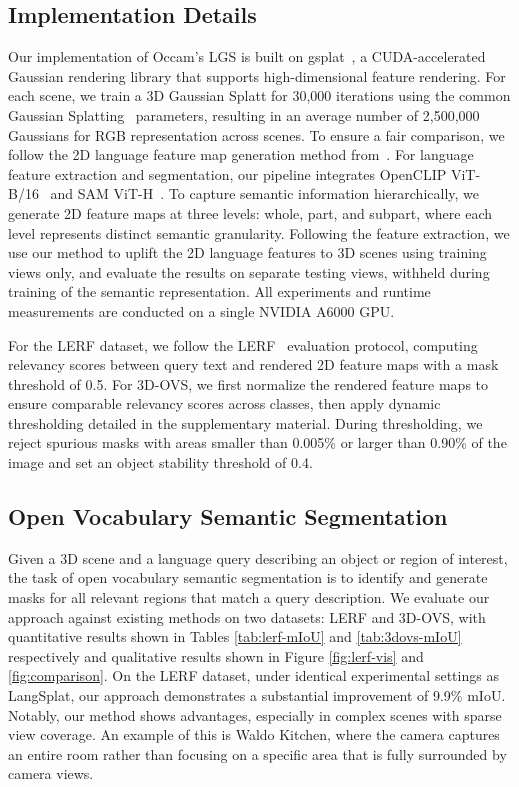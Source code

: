 \subsection{Implementation Details}
Our implementation of Occam's LGS is built on gsplat~\cite{ye2024gsplatopensourcelibrarygaussian}, a CUDA-accelerated Gaussian rendering library that supports high-dimensional feature rendering. For each scene, we train a 3D Gaussian Splatt for 30,000 iterations using the common Gaussian Splatting~\cite{kerbl3Dgaussians} parameters, resulting in an average number of 2,500,000 Gaussians for RGB representation across scenes. To ensure a fair comparison, we follow the 2D language feature map generation method from~\cite{qin2024langsplat}. For language feature extraction and segmentation, our pipeline integrates OpenCLIP ViT-B/16~\cite{Radford2021LearningTV} and SAM ViT-H~\cite{kirillov2023segment}. To capture semantic information hierarchically, we generate 2D feature maps at three levels:  whole, part, and subpart, where each level represents distinct semantic granularity. Following the feature extraction, we use our method to uplift the 2D language features to 3D scenes using training views only, and evaluate the results on separate testing views, withheld during training of the semantic representation. All experiments and runtime measurements are conducted on a single NVIDIA A6000 GPU. 

For the LERF dataset, we follow the LERF~\cite{kerr2023lerf} evaluation protocol, computing relevancy scores between query text and rendered 2D feature maps with a mask threshold of 0.5. For 3D-OVS, we first normalize the rendered feature maps to ensure comparable relevancy scores across classes, then apply dynamic thresholding detailed in the supplementary material. During thresholding, we reject spurious masks with areas smaller than 0.005\% or larger than 0.90\% of the image and set an object stability threshold of 0.4.

\subsection{Open Vocabulary Semantic Segmentation}
Given a 3D scene and a language query describing an object or region of interest, the task of open vocabulary semantic segmentation is to identify and generate masks for all relevant regions that match a query description. We evaluate our approach against existing methods on two datasets: LERF and 3D-OVS, with quantitative results shown in Tables \ref{tab:lerf-mIoU} and \ref{tab:3dovs-mIoU} respectively and qualitative results shown in Figure \ref{fig:lerf-vis} and \ref{fig:comparison}. On the LERF dataset, under identical experimental settings as LangSplat, our approach demonstrates a substantial improvement of 9.9\% mIoU. Notably, our method shows advantages, especially in complex scenes with sparse view coverage. An example of this is Waldo Kitchen, where the camera captures an entire room rather than focusing on a specific area that is fully surrounded by camera views. 

